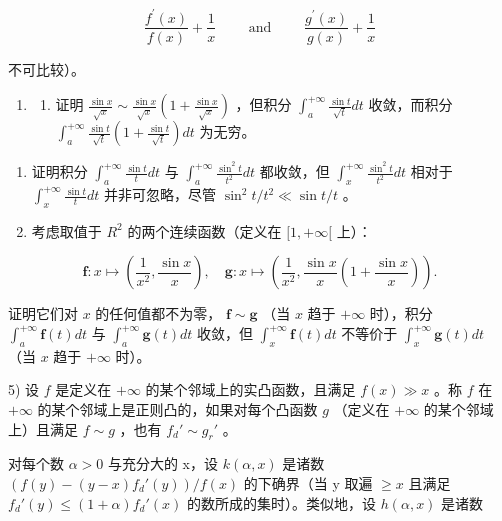\[
\frac {f ^ {\prime} (x)}{f (x)} + \frac {1}{x} \qquad \text { and } \qquad \frac {g ^ {\prime} (x)}{g (x)} + \frac {1}{x}
\]

不可比较）。

\begin{enumerate}
\def\labelenumi{\arabic{enumi})}
\setcounter{enumi}{3}
\tightlist
\item
  \begin{enumerate}
  \def\labelenumii{\alph{enumii})}
  \tightlist
  \item
    证明 \(\frac{\sin x}{\sqrt{x}} \sim \frac{\sin x}{\sqrt{x}} \left(1 + \frac{\sin x}{\sqrt{x}}\right)\) ，但积分 \(\int_{a}^{+\infty} \frac{\sin t}{\sqrt{t}} dt\) 收敛，而积分 \(\int_{a}^{+\infty} \frac{\sin t}{\sqrt{t}} \left(1 + \frac{\sin t}{\sqrt{t}}\right) dt\) 为无穷。
  \end{enumerate}
\end{enumerate}

\begin{enumerate}
\def\labelenumi{\alph{enumi})}
\setcounter{enumi}{1}
\item
  证明积分 \(\int_{a}^{+\infty}\frac{\sin t}{t}dt\) 与 \(\int_{a}^{+\infty}\frac{\sin^{2}t}{t^{2}}dt\) 都收敛，但 \(\int_{x}^{+\infty}\frac{\sin^{2}t}{t^{2}}dt\) 相对于 \(\int_{x}^{+\infty}\frac{\sin t}{t}dt\) 并非可忽略，尽管 \(\sin^{2}t/t^{2}\ll\sin t/t\) 。
\item
  考虑取值于 \(R^{2}\) 的两个连续函数（定义在 \([1, +\infty[\) 上）：
\end{enumerate}

\[
\mathbf {f}: x \mapsto \left(\frac {1}{x ^ {2}}, \frac {\sin x}{x}\right), \quad \mathbf {g}: x \mapsto \left(\frac {1}{x ^ {2}}, \frac {\sin x}{x} \left(1 + \frac {\sin x}{x}\right)\right).
\]

证明它们对 \(x\) 的任何值都不为零， \(\mathbf{f} \sim \mathbf{g}\) （当 \(x\) 趋于 \(+\infty\) 时），积分 \(\int_{a}^{+\infty} \mathbf{f}(t) dt\) 与 \(\int_{a}^{+\infty} \mathbf{g}(t) dt\) 收敛，但 \(\int_{x}^{+\infty} \mathbf{f}(t) dt\) 不等价于 \(\int_{x}^{+\infty} \mathbf{g}(t) dt\) （当 \(x\) 趋于 \(+\infty\) 时）。

5) 设 \(f\) 是定义在 \(+\infty\) 的某个邻域上的实凸函数，且满足 \(f(x) \gg x\) 。称 \(f\) 在 \(+\infty\) 的某个邻域上是正则凸的，如果对每个凸函数 \(g\) （定义在 \(+\infty\) 的某个邻域上）且满足 \(f \sim g\) ，也有 \(f_d' \sim g_r'\) 。

对每个数 \(\alpha > 0\) 与充分大的 x，设 \(k(\alpha, x)\) 是诸数 \(\left(f(y) - (y - x)f_{d}'(y)\right)/f(x)\) 的下确界（当 y 取遍 \(\geqslant x\) 且满足 \(f_{d}'(y) \leqslant (1 + \alpha)f_{d}'(x)\) 的数所成的集时）。类似地，设 \(h(\alpha, x)\) 是诸数

